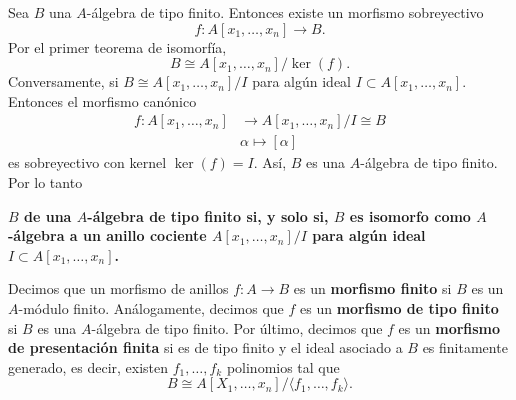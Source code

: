     \begin{remark}
    	Sea $B$ una $A$-álgebra de tipo finito. Entonces existe un morfismo sobreyectivo
    	\begin{equation*}
    		f:A[x_1,\dots,x_n]\longrightarrow B.
    	\end{equation*}
    	Por el primer teorema de isomorfía,
    	\begin{equation*}
    		B\cong A[x_1,\dots,x_n]/\ker(f).
    	\end{equation*}
    	Conversamente, si $B\cong A[x_1,\dots,x_n]/I$ para algún ideal $I\subset A[x_1,\dots,x_n]$. Entonces el morfismo canónico
    	\begin{align*}
    		f:A[x_1,\dots,x_n]&\longrightarrow A[x_1,\dots,x_n]/I\cong B\\
    		&\alpha\mapsto [\alpha]
    	\end{align*}
    	es sobreyectivo con kernel $\ker(f)=I$. Así, $B$ es una $A$-álgebra de tipo finito. Por lo tanto
    	\begin{center}
    		\textbf{$B$ de una $A$-álgebra de tipo finito si, y solo si, $B$ es isomorfo como $A$-álgebra a un anillo cociente $A[x_1,\dots,x_n]/I$ para algún ideal $I\subset A[x_1,\dots,x_n]$.}
    	\end{center}
    \end{remark}
    
    
    \begin{definition}
    	Decimos que un morfismo de anillos $f:A\to B$ es un \textbf{morfismo finito} si $B$ es un $A$-módulo finito. Análogamente, decimos que $f$ es un \textbf{morfismo de tipo finito} si $B$ es una $A$-álgebra de tipo finito.
    	Por último, decimos que $f$ es un \textbf{morfismo de presentación finita} si es de tipo finito y el ideal asociado a $B$ es finitamente generado, es decir, existen $f_1,\dots,f_k$ polinomios tal que
    	\begin{equation*}
    		B\cong A[X_1,\dots,x_n]/\langle f_1,\dots,f_k\rangle.
    	\end{equation*}
    \end{definition}
    
